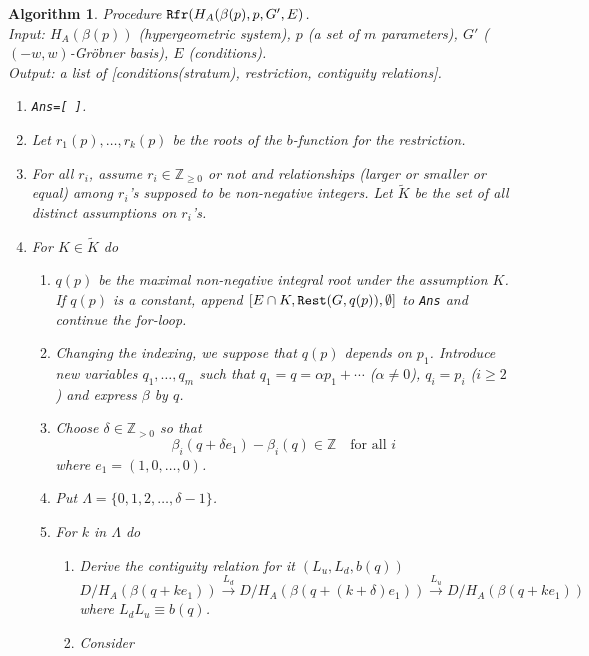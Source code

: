\documentclass{article}
\def\ZZ{\mathbb{Z}}
\newtheorem{algorithm}{Algorithm}
\begin{document}
\begin{algorithm} \label{alg:hg-rest} \rm
Procedure $\mbox{\tt Rfr}(H_A(\beta(p),p,G',E)$. \quad \\
Input: $H_A(\beta(p))$ (hypergeometric system), $p$ (a set of $m$ parameters), 
$G'$ ($(-w,w)$-Gr\"obner basis), $E$ (conditions). \\
Output: a list of [conditions(stratum), restriction, contiguity relations].
\begin{enumerate}
\item {\tt Ans=[\,]}.
\item Let $r_1(p), \ldots, r_k(p)$ be the roots
of the $b$-function for the restriction.
\item For all $r_i$, assume $r_i \in \ZZ_{\geq 0}$ or not
and relationships (larger or smaller or equal)
among $r_i$'s supposed to be non-negative integers.
Let $\tilde K$ be the set of all distinct assumptions
on $r_i$'s.
\item For $K \in {\tilde K}$ do
\begin{enumerate}
\item $q(p)$ be the maximal non-negative integral root under the assumption $K$.
If $q(p)$ is a constant, append
$[E \cap K, \mbox{\tt Rest}(G,q(p)), \emptyset]$ to {\tt Ans}
and continue the for-loop.
\item Changing the indexing, 
we suppose that $q(p)$ depends on $p_1$.
Introduce new variables $q_1, \ldots, q_m$
such that
$q_1 = q = \alpha p_1 + \cdots$ ($\alpha \not= 0$),
$q_i=p_i$ ($i \geq 2$)
and express $\beta$ by $q$.
\item Choose $\delta \in \ZZ_{>0}$ so that
\begin{equation}
 \beta_i(q+\delta e_1)-\beta_i(q) \in \ZZ \quad
\mbox{for all $i$}
\end{equation}
where $e_1=(1,0, \ldots, 0)$.
\item Put $\Lambda = \{0, 1, 2, \ldots, \delta-1\}$.
\item For $k$ in $\Lambda$ do
\begin{enumerate}
\item Derive the contiguity relation for it $(L_u, L_d, b(q))$
\begin{equation}
  D/H_A(\beta(q+k e_1))
\stackrel{L_d}{\rightarrow}
  D/H_A(\beta(q+(k+\delta)e_1))
\stackrel{L_u}{\rightarrow}
  D/H_A(\beta(q+k e_1))
\end{equation}
where $ L_d L_u \equiv b(q)$.
\item Consider 
\begin{equation}  \label{eq:segments}

\end{equation}
\end{enumerate}
\end{enumerate}
\end{enumerate}
\end{algorithm}
\end{document}
